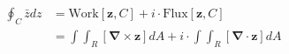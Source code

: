 \documentclass[preview]{standalone}
\begin{document}
\begin{center}
\begin{align*} \oint_{C} \bar{z} dz &= \text{Work}\left[ \boldsymbol{z}, C \right] + i \cdot \text{Flux}\left[ \boldsymbol{z}, C \right] \\ &= \int\int_{R} \left[ \mathbf{\nabla} \times \mathbf{z} \right] dA +  i \cdot \int\int_{R} \left[ \mathbf{\nabla} \cdot \mathbf{z} \right] dA\\ \end{align*}
\end{center}
\end{document}

